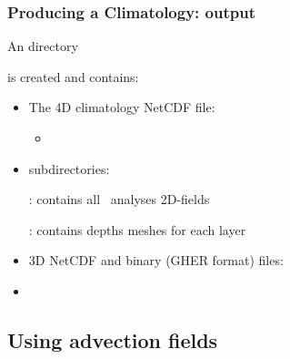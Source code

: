 \begin{frame}
\frametitle{Producing a Climatology: output}

\centerline{An  directory}
\centerline{is created and contains:}

\begin{itemize}
\item The 4D climatology NetCDF file:
\begin{itemize}
\item[] {\Large {}}
\end{itemize}
\end{itemize}

\begin{itemize}
\item subdirectories:\par
 : contains all \diva\ analyses 2D-fields\par
 : contains depths meshes for each layer
\item 3D NetCDF and  binary (GHER format) files:\par
{\scriptsize
  \par
 }
 \item {}
\end{itemize}

\end{frame}

\subsection{Using advection fields}


